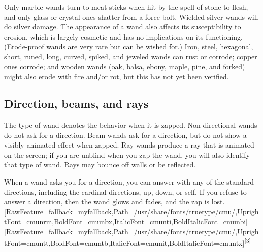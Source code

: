 Only marble wands turn to meat sticks\footnotemark[76] when hit by the spell of stone to flesh\footnotemark[77], and only glass or crystal ones shatter from a force bolt\footnotemark[78]. Wielded silver wands will do silver\footnotemark[79] damage. The appearance of a wand also affects its susceptibility to erosion, which is largely cosmetic and has no implications on its functioning. (Erode-{}proof wands are very rare but can be wished for.) Iron, steel, hexagonal, short, runed, long, curved, spiked, and jeweled wands can rust or corrode; copper ones corrode; and wooden wands (oak, balsa, ebony, maple, pine, and forked) might also erode with fire and/or rot, but this has not yet been verified.



\subsection{Direction, beams, and rays}
\label{4}
The type of wand denotes the behavior when it is zapped. Non-{}directional wands do not ask for a direction. Beam\footnotemark[80] wands ask for a direction, but do not show a visibly animated effect when zapped. Ray\footnotemark[81] wands produce a ray that is animated on the screen; if you are unblind when you zap the wand, you will also identify that type of wand. Rays may bounce off walls\footnotemark[82] or be reflected\footnotemark[83].


When a wand asks you for a direction, you can answer with any of the standard directions\footnotemark[84], including the cardinal directions, up, down, or self. If you refuse to answer a direction, then the wand glows and fades, and the zap is lost.\allowbreak{}\setmainfont{cmunrm.ttf}[RawFeature={fallback=myfallback},Path=/usr/share/fonts/truetype/cmu/,UprightFont=cmunrm,BoldFont=cmunbx,ItalicFont=cmunti,BoldItalicFont=cmunbi]\setmonofont{cmunrm.ttf}[RawFeature={fallback=myfallback},Path=/usr/share/fonts/truetype/cmu/,UprightFont=cmuntt,BoldFont=cmuntb,ItalicFont=cmunit,BoldItalicFont=cmuntx]\textsuperscript{{$\text{[}$}3{$\text{]}$}}


